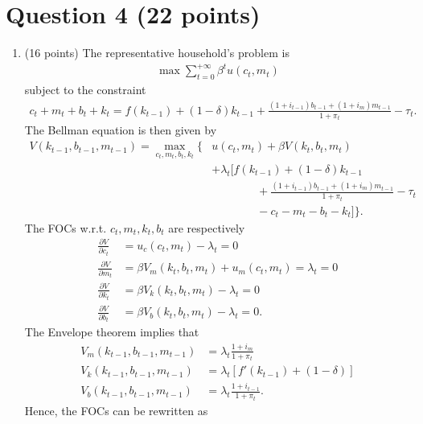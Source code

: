 \documentclass[12pt]{article}
\begin{document}
\section*{Question 4 (22 points)}
\begin{enumerate}[label=\arabic*.]
    \item (16 points) The representative household's problem is
    \begin{align*}
        \max \sum_{t=0}^{+\infty} \beta^t u(c_t, m_t)
    \end{align*}
    subject to the constraint
    \begin{align*}
        c_t + m_t + b_t + k_t = f(k_{t-1}) + (1-\delta) k _{t-1} + \frac{(1+i_{t-1})b_{t-1} + (1+i_m) m_{t-1}}{1+\pi_t} - \tau_t.
    \end{align*}
    The Bellman equation is then given by
    \begin{align*}
        V(k_{t-1}, b_{t-1}, m_{t-1}) = \max_{c_t, m_t, b_t, k_t} \Bigg\{ & u(c_t, m_t) + \beta V(k_t, b_t, m_t)\\
        & + \lambda_t \bigg[f(k_{t-1}) + (1-\delta) k _{t-1} \\
        & \qquad \qquad + \frac{(1+i_{t-1})b_{t-1} + (1+i_m) m_{t-1}}{1+\pi_t} - \tau_t\\
        & \qquad \qquad - c_t - m_t - b_t - k_t \bigg] \Bigg\}.
    \end{align*}
    The FOCs w.r.t. $c_t, m_t, k_t, b_t$ are respectively
    \begin{align*}
        \frac{\partial V}{\partial c_t} &= u_c(c_t, m_t) - \lambda_t = 0\\
        \frac{\partial V}{\partial m_t} &= \beta V_m(k_t, b_t, m_t)+ u_m(c_t, m_t) = \lambda_t= 0\\
        \frac{\partial V}{\partial k_t} &= \beta V_k(k_t, b_t, m_t) - \lambda_t = 0\\
        \frac{\partial V}{\partial b_t} &= \beta V_b(k_t, b_t, m_t) - \lambda_t = 0.
    \end{align*}
    The Envelope theorem implies that
    \begin{align*}
        V_m(k_{t-1}, b_{t-1}, m_{t-1}) & = \lambda_t \frac{1+i_m}{1+\pi_t}\\
        V_k(k_{t-1}, b_{t-1}, m_{t-1}) & = \lambda_t \left[f'(k_{t-1}) + (1-\delta)\right]\\
        V_b(k_{t-1}, b_{t-1}, m_{t-1}) & = \lambda_t \frac{1+i_{t-1}}{1+\pi_t}.
    \end{align*}
    Hence, the FOCs can be rewritten as
    \begin{align*}

\end{align*}
\end{enumerate}
\end{document}
